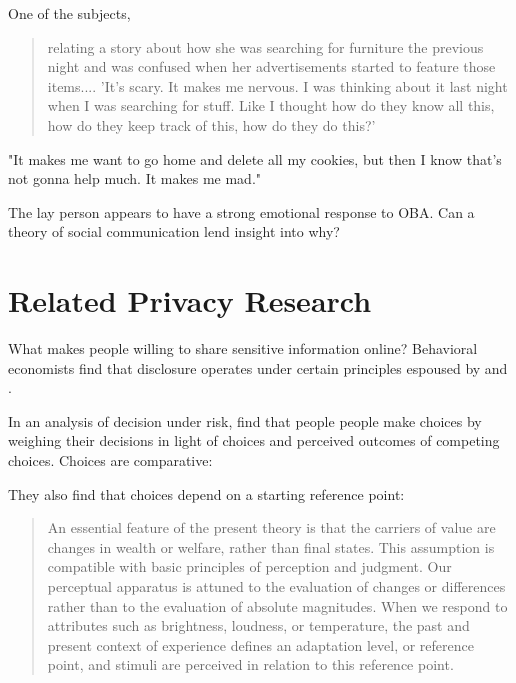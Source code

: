 \vspace{10pt}

One of the subjects, 
\begin{quote}
relating a story about how she was searching for furniture the previous night and was confused when her advertisements started to feature those items.... 'It's scary. It makes me nervous. I was thinking about it last night when I was searching for stuff. Like I thought how do they know all this, how do they keep track of this, how do they do this?' \citep[p. 7]{Ur:2012ws}
\end{quote}
\vspace{10pt}

"It makes me want to go home and delete all my cookies, but then I know that's not gonna help much. It makes me mad." \citep[p. 7]{Ur:2012ws}

\vspace{10pt}
The lay person appears to have a strong emotional response to OBA. Can a theory of social communication lend insight into why? 


\section{Related Privacy Research}
\label{relatedprivacyresearch}

What makes people willing to share sensitive information online? Behavioral economists  \citet*{Acquisti:2012tp}  find that disclosure operates under certain principles espoused by  \cite{Kahneman:1979wl} and \cite{Tversky:1981vc}. 

In an analysis of decision under risk,  \cite{Tversky:1981vc}  find that people people make choices by weighing their decisions in light of choices and perceived outcomes of competing choices. Choices are comparative:

They also find that choices depend on a starting reference point:
\begin{quote}
An essential feature of the present theory is that the carriers of value are 
changes in wealth or welfare, rather than final states. This assumption is compatible with basic principles of perception and judgment. Our perceptual apparatus is attuned to the evaluation of changes or differences rather than to the evaluation of absolute magnitudes. When we respond to attributes such as brightness, loudness, or temperature, the past and present context of experience defines an adaptation level, or reference point, and stimuli are perceived in relation to this reference point. \citep[p. 277]{Kahneman:1979wl}
\end{quote}

